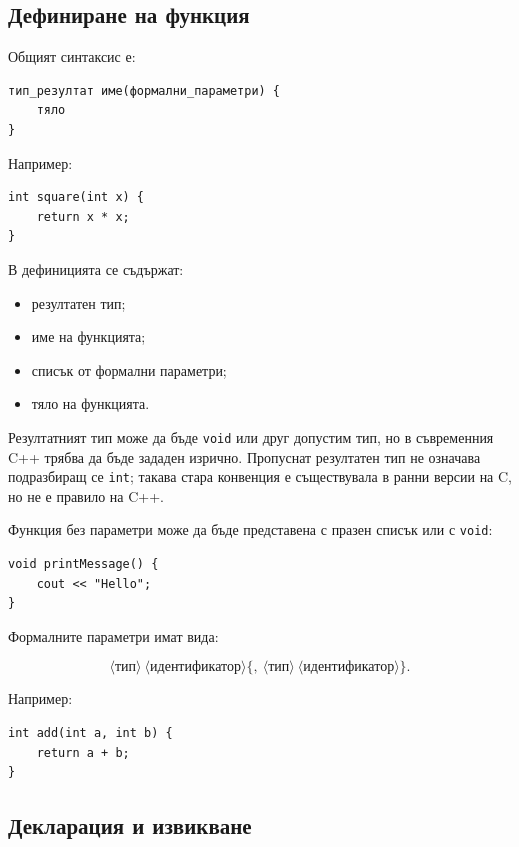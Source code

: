 \subsection{Дефиниране на функция}\label{s:14.6.1}

Общият синтаксис е:

\begin{verbatim}
тип_резултат име(формални_параметри) {
    тяло
}
\end{verbatim}

Например:

\begin{verbatim}
int square(int x) {
    return x * x;
}
\end{verbatim}

В дефиницията се съдържат:

\begin{itemize}
\item резултатен тип;
\item име на функцията;
\item списък от формални параметри;
\item тяло на функцията.
\end{itemize}

Резултатният тип може да бъде \texttt{void} или друг допустим тип, но в съвременния C++ трябва да бъде зададен изрично. Пропуснат резултатен тип не означава подразбиращ се \texttt{int}; такава стара конвенция е съществувала в ранни версии на C, но не е правило на C++.

Функция без параметри може да бъде представена с празен списък или с \texttt{void}:

\begin{verbatim}
void printMessage() {
    cout << "Hello";
}
\end{verbatim}

Формалните параметри имат вида:

\[
\langle\text{тип}\rangle\ \langle\text{идентификатор}\rangle
\{
,\ \langle\text{тип}\rangle\ \langle\text{идентификатор}\rangle
\}.
\]

Например:

\begin{verbatim}
int add(int a, int b) {
    return a + b;
}
\end{verbatim}

\subsection{Декларация и извикване}\label{s:14.6.2}

